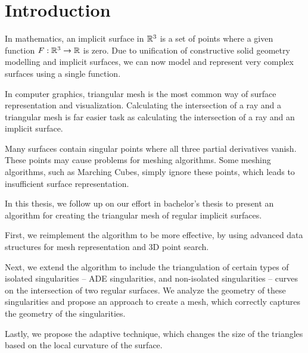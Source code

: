 \chapter*{Introduction} %

In mathematics, an implicit surface in $\mathbb{R}^3$ is a set of points where
a given function $F:\mathbb{R}^3 \to \mathbb{R}$ is zero. Due to
unification of constructive solid geometry modelling and 
implicit surfaces, we can now model and represent very 
complex surfaces using a single function.

In computer graphics, triangular mesh is the most common
way of surface representation and visualization. Calculating
the intersection of a ray and a triangular mesh is far 
easier task as calculating the intersection of a ray and
an implicit surface.

Many surfaces contain singular points where all three partial
derivatives vanish. These points may cause problems for
meshing algorithms. Some meshing algorithms, such as 
Marching Cubes, simply ignore these points,
which leads to insufficient surface representation.

In this thesis, we follow up on our effort in bachelor's thesis
\cite{korecova2021triangulation} to present an algorithm for
creating the triangular mesh of regular implicit surfaces.

First, we reimplement the algorithm to be more effective,
by using advanced data structures for mesh representation 
and 3D point search.

Next, we extend the algorithm to include the triangulation
of certain types of isolated singularities -- ADE singularities,
and non-isolated singularities -- curves on the intersection
of two regular surfaces.
We analyze the geometry of these singularities and propose 
an approach to create a mesh, which correctly captures
the geometry of the singularities.

Lastly, we propose the adaptive technique, which changes the
size of the triangles based on the local curvature of the surface.